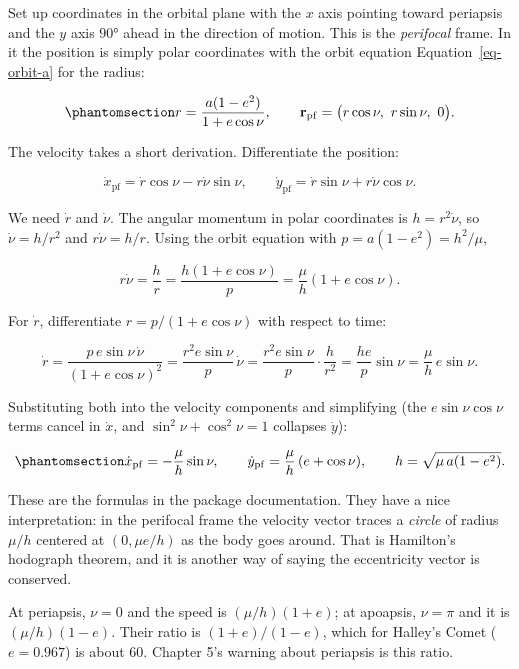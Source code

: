 \documentclass[
  10.5pt,
  letterpaper,
]{scrbook}
\theoremstyle{plain}
\theoremstyle{remark}
\begin{document}
Set up coordinates in the orbital plane with the \(x\) axis pointing
toward periapsis and the \(y\) axis \(90°\) ahead in the direction of
motion. This is the \emph{perifocal} frame. In it the position is simply
polar coordinates with the orbit equation Equation~\ref{eq-orbit-a} for
the radius:

\begin{equation}\protect\phantomsection\label{eq-pf-position}{
r = \frac{a(1-e^2)}{1 + e\cos\nu}, \qquad
\mathbf{r}_{\mathrm{pf}} = \big(r\cos\nu,\ r\sin\nu,\ 0\big).
}\end{equation}

The velocity takes a short derivation. Differentiate the position:

\[
\dot x_{\mathrm{pf}} = \dot r\cos\nu - r\dot\nu\sin\nu, \qquad
\dot y_{\mathrm{pf}} = \dot r\sin\nu + r\dot\nu\cos\nu.
\]

We need \(\dot r\) and \(\dot\nu\). The angular momentum in polar
coordinates is \(h = r^2\dot\nu\), so \(\dot\nu = h/r^2\) and
\(r\dot\nu = h/r\). Using the orbit equation with
\(p = a(1-e^2) = h^2/\mu\),

\[
r\dot\nu = \frac{h}{r} = \frac{h(1+e\cos\nu)}{p} = \frac{\mu}{h}(1 + e\cos\nu).
\]

For \(\dot r\), differentiate \(r = p/(1+e\cos\nu)\) with respect to
time:

\[
\dot r = \frac{p\,e\sin\nu\,\dot\nu}{(1+e\cos\nu)^2} = \frac{r^2 e\sin\nu}{p}\,\dot\nu = \frac{r^2 e\sin\nu}{p}\cdot\frac{h}{r^2} = \frac{h e}{p}\sin\nu = \frac{\mu}{h}\,e\sin\nu.
\]

Substituting both into the velocity components and simplifying (the
\(e\sin\nu\cos\nu\) terms cancel in \(\dot x\), and
\(\sin^2\nu + \cos^2\nu = 1\) collapses \(\dot y\)):

\begin{equation}\protect\phantomsection\label{eq-pf-velocity}{
\dot x_{\mathrm{pf}} = -\frac{\mu}{h}\sin\nu, \qquad
\dot y_{\mathrm{pf}} = \frac{\mu}{h}\,(e + \cos\nu), \qquad
h = \sqrt{\mu\,a(1-e^2)}.
}\end{equation}

These are the formulas in the package documentation. They have a nice
interpretation: in the perifocal frame the velocity vector traces a
\emph{circle} of radius \(\mu/h\) centered at \((0, \mu e/h)\) as the
body goes around. That is Hamilton's hodograph theorem, and it is
another way of saying the eccentricity vector is conserved.

At periapsis, \(\nu = 0\) and the speed is \((\mu/h)(1+e)\); at
apoapsis, \(\nu = \pi\) and it is \((\mu/h)(1-e)\). Their ratio is
\((1+e)/(1-e)\), which for Halley's Comet (\(e = 0.967\)) is about 60.
Chapter 5's warning about periapsis is this ratio.
\end{document}
